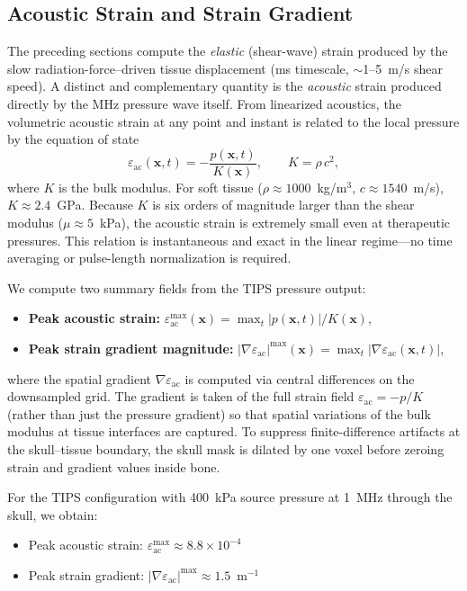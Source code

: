\documentclass[11pt]{article}
\begin{document}
\subsection{Acoustic Strain and Strain Gradient}
\label{sec:acoustic_strain}

The preceding sections compute the \emph{elastic} (shear-wave) strain produced
by the slow radiation-force--driven tissue displacement (ms timescale,
$\sim$1--5~m/s shear speed).  A distinct and complementary quantity is the
\emph{acoustic} strain produced directly by the MHz pressure wave itself.  From
linearized acoustics, the volumetric acoustic strain at any point and instant is
related to the local pressure by the equation of state
\begin{equation}
  \varepsilon_{\mathrm{ac}}(\mathbf{x},t)
  = -\frac{p(\mathbf{x},t)}{K(\mathbf{x})},
  \qquad
  K = \rho\,c^2,
  \label{eq:acoustic_strain}
\end{equation}
where $K$ is the bulk modulus.  For soft tissue ($\rho \approx 1000$~kg/m$^3$,
$c \approx 1540$~m/s), $K \approx 2.4$~GPa.  Because $K$ is six orders of
magnitude larger than the shear modulus ($\mu \approx 5$~kPa), the
acoustic strain is extremely small even at therapeutic pressures.  This
relation is instantaneous and exact in the linear regime---no time
averaging or pulse-length normalization is required.

We compute two summary fields from the TIPS pressure output:
\begin{itemize}[leftmargin=1.5em]
  \item \textbf{Peak acoustic strain:} $\varepsilon_{\mathrm{ac}}^{\max}(\mathbf{x}) = \max_t |p(\mathbf{x},t)|/K(\mathbf{x})$,
  \item \textbf{Peak strain gradient magnitude:} $|\nabla\varepsilon_{\mathrm{ac}}|^{\max}(\mathbf{x}) = \max_t |\nabla\varepsilon_{\mathrm{ac}}(\mathbf{x},t)|$,
\end{itemize}
where the spatial gradient $\nabla\varepsilon_{\mathrm{ac}}$ is computed via
central differences on the downsampled grid.  The gradient is taken of the
full strain field $\varepsilon_{\mathrm{ac}} = -p/K$ (rather than just the
pressure gradient) so that spatial variations of the bulk modulus at
tissue interfaces are captured.  To suppress finite-difference artifacts at
the skull--tissue boundary, the skull mask is dilated by one voxel before
zeroing strain and gradient values inside bone.

For the TIPS configuration with 400~kPa source pressure at 1~MHz through the
skull, we obtain:
\begin{itemize}[leftmargin=1.5em]
  \item Peak acoustic strain: $\varepsilon_{\mathrm{ac}}^{\max} \approx 8.8 \times 10^{-4}$
  \item Peak strain gradient: $|\nabla\varepsilon_{\mathrm{ac}}|^{\max} \approx 1.5$~m$^{-1}$
\end{itemize}
\end{document}
